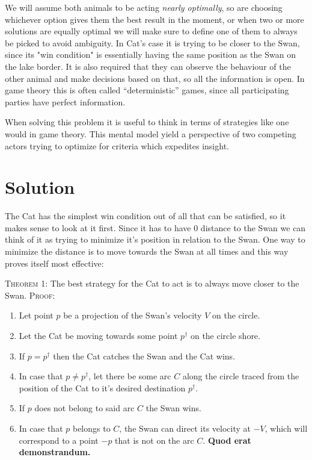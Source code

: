 \documentclass[12pt]{article}
\begin{document}
We will assume both animals to be acting \textit{nearly optimally}, so are choosing whichever option gives them the best result in the moment, or when two or more solutions are equally optimal we will make sure to define one of them to always be picked to avoid ambiguity. In Cat's case it is trying to be closer to the Swan, since its "win condition" is essentially having the same position as the Swan on the lake border. It is also required that they can observe the behaviour of the other animal and make decisions based on that, so all the information is open. In game theory this is often called ``deterministic''\citep{strictgame} games, since all participating parties have perfect\citep{strictgame} information.

When solving this problem it is useful to think in terms of strategies like one would in game theory. This mental model yield a perspective of two competing actors trying to optimize for criteria which expedites insight. 

\section{Solution}

The Cat has the simplest win condition out of all that can be satisfied, so it makes sense to look at it first. Since it has to have 0 distance to the Swan we can think of it as trying to minimize it's position in relation to the Swan. One way to minimize the distance is to move towards the Swan at all times and this way proves itself most effective:

\begin{samepage}
	\textsc{Theorem 1}: The best strategy for the Cat to act is to always move closer to the Swan.
	\nopagebreak
	\textsc{Proof}:
	\begin{enumerate}
	\item Let point $p$ be a projection of the Swan's velocity $V$ on the circle.
	\item Let the Cat be moving towards some point $p^\dagger$ on the circle shore.
	\item If $p = p^\dagger$ then the Cat catches the Swan and the Cat wins. 
	\item In case that $p \neq p^\dagger$, let there be some arc $C$ along the circle traced from the position of the Cat to it's desired destination $p^\dagger$.
	\item If $p$ does not belong to said arc $C$ the Swan wins.
	\item In case that $p$ belongs to $C$, the Swan can direct its velocity at $-V$, which will correspond to a point $-p$ that is not on the arc $C$. \textbf{Quod erat demonstrandum.}
	\end{enumerate}
\end{samepage}
\end{document}

